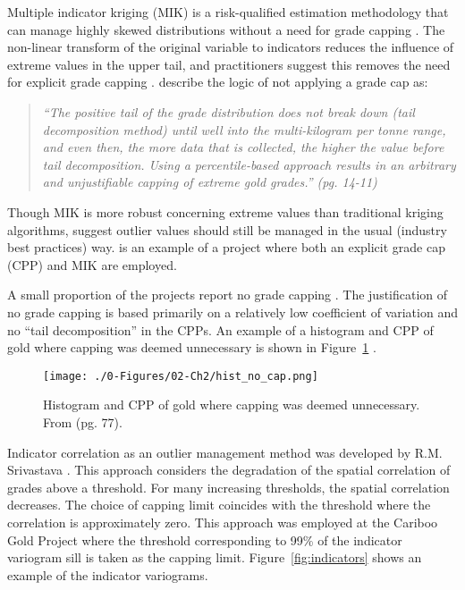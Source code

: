 Multiple indicator kriging (MIK) is a risk-qualified estimation methodology that can manage highly skewed distributions without a need for grade capping \citep{journel1983nonparametric}. The non-linear transform of the original variable to indicators reduces the influence of extreme values in the upper tail, and practitioners suggest this removes the need for explicit grade capping \citep{pretium2020, ngm2020, tristar2021, cardinal2019}. \cite{pretium2020} describe the logic of not applying a grade cap as:
\blockquote{\textit{``The positive tail of the grade distribution does
        not break down (tail decomposition method) until well into the multi-kilogram per tonne range, and even then, the more data that is collected, the higher the value before tail decomposition. Using a percentile-based approach results in an arbitrary and unjustifiable capping of extreme gold grades.'' (pg. 14-11)}}
Though MIK is more robust concerning extreme values than traditional kriging algorithms, \cite{carvalho2017overview} suggest outlier values should still be managed in the usual (industry best practices) way. \cite{artemis2020} is an example of a project where both an explicit grade cap (CPP) and MIK are employed.

A small proportion of the projects report no grade capping \citep{medgold2021,pasofino2020,eldorado2020}. The justification of no grade capping is based primarily on a relatively low coefficient of variation and no ``tail decomposition'' in the CPPs. An example of a histogram and CPP of gold where capping was deemed unnecessary is shown in Figure~\ref{fig:nocap} \citep{medgold2021}.

\begin{figure}[htb!]
    \centering
    \texttt{[image: ./0-Figures/02-Ch2/hist\_no\_cap.png]}
    \caption{Histogram and CPP of gold where capping was deemed unnecessary. From \cite{medgold2021} (pg. 77).}
    \label{fig:nocap}
\end{figure}

Indicator correlation as an outlier management method was developed by R.M. Srivastava \citep{leuangthong2015dealing}. This approach considers the degradation of the spatial correlation of grades above a threshold. For many increasing thresholds, the spatial correlation decreases. The choice of capping limit coincides with the threshold where the correlation is approximately zero. This approach was employed at the Cariboo Gold Project \citep{osiko2020} where the threshold corresponding to 99\% of the indicator variogram sill is taken as the capping limit. Figure~\ref{fig:indicators} shows an example of the indicator variograms.


